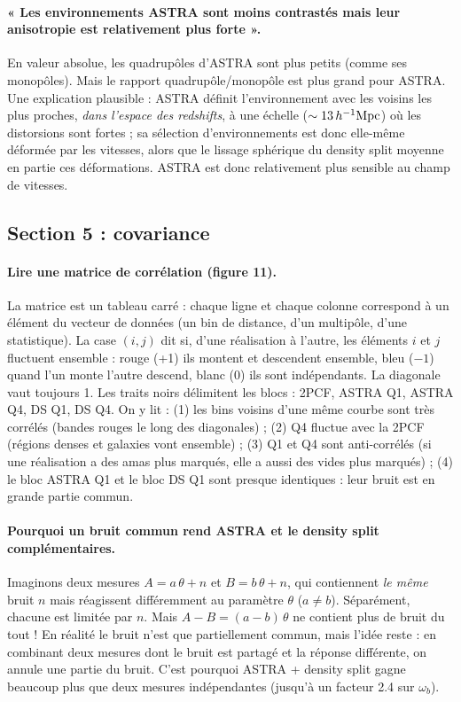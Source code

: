 \paragraph{« Les environnements ASTRA sont moins contrastés mais leur anisotropie est relativement plus forte ».} En valeur absolue, les quadrupôles d'ASTRA sont plus petits (comme ses monopôles). Mais le rapport quadrupôle/monopôle est plus grand pour ASTRA. Une explication plausible : ASTRA définit l'environnement avec les voisins les plus proches, \emph{dans l'espace des redshifts}, à une échelle ($\sim13\,h^{-1}\mathrm{Mpc}$) où les distorsions sont fortes ; sa sélection d'environnements est donc elle-même déformée par les vitesses, alors que le lissage sphérique du density split moyenne en partie ces déformations. ASTRA est donc relativement plus sensible au champ de vitesses.

\subsection{Section 5 : covariance}

\paragraph{Lire une matrice de corrélation (figure 11).} La matrice est un tableau carré : chaque ligne et chaque colonne correspond à un élément du vecteur de données (un bin de distance, d'un multipôle, d'une statistique). La case $(i,j)$ dit si, d'une réalisation à l'autre, les éléments $i$ et $j$ fluctuent ensemble : rouge (+1) ils montent et descendent ensemble, bleu ($-1$) quand l'un monte l'autre descend, blanc (0) ils sont indépendants. La diagonale vaut toujours 1. Les traits noirs délimitent les blocs : 2PCF, ASTRA Q1, ASTRA Q4, DS Q1, DS Q4. On y lit : (1) les bins voisins d'une même courbe sont très corrélés (bandes rouges le long des diagonales) ; (2) Q4 fluctue avec la 2PCF (régions denses et galaxies vont ensemble) ; (3) Q1 et Q4 sont anti-corrélés (si une réalisation a des amas plus marqués, elle a aussi des vides plus marqués) ; (4) le bloc ASTRA Q1 et le bloc DS Q1 sont presque identiques : leur bruit est en grande partie commun.

\paragraph{Pourquoi un bruit commun rend ASTRA et le density split complémentaires.} Imaginons deux mesures $A = a\,\theta + n$ et $B = b\,\theta + n$, qui contiennent \emph{le même} bruit $n$ mais réagissent différemment au paramètre $\theta$ ($a\ne b$). Séparément, chacune est limitée par $n$. Mais $A - B = (a-b)\,\theta$ ne contient plus de bruit du tout ! En réalité le bruit n'est que partiellement commun, mais l'idée reste : en combinant deux mesures dont le bruit est partagé et la réponse différente, on annule une partie du bruit. C'est pourquoi ASTRA + density split gagne beaucoup plus que deux mesures indépendantes (jusqu'à un facteur 2.4 sur $\omega_b$).


